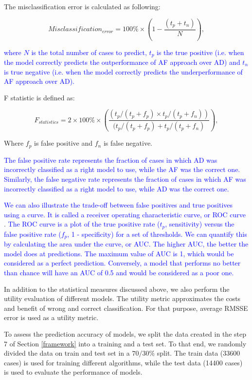 \documentclass[preprint, 3p,
authoryear]{elsarticle} %
\begin{document}
The misclassification error is calculated as following:

\[Misclassification_{error} = 100\% \times \left( 1-\frac{(t_p+t_n)}{N}\right),\]

\textcolor{blue}{where $N$ is the total number of cases to predict, $t_p$ is the true positive (i.e. when the model correctly predicts the outperformance of AF approach over AD) and $t_n$ is true negative (i.e. when the model correctly predicts the underperformance of AF approach over AD).}

F statistic is defined as:

\[F_{statistics} = 2 \times 100\% \times \left(\frac{(t_p/(t_p+f_p) \times t_p/(t_p+f_n))}{(t_p/(t_p+f_p)+t_p/(t_p+f_n)}\right),\]

Where \(f_p\) is false positive and \(f_n\) is false negative.

\textcolor{blue}{The false positive rate represents the fraction of cases in which AD was incorrectly classified as a right model to use, while the AF was the correct one. Similarly, the false negative rate represents the fraction of cases in which AF was incorrectly classified as a right model to use, while AD was the correct one.}

\textcolor{blue}{We can also illustrate the trade-off between false positives and true positives using a curve. It is called a receiver operating characteristic curve, or ROC curve}
\citep{james2021statistical}.
\textcolor{blue}{The ROC curve is a plot of the true positive rate ($t_p$, sensitivity) versus the false positive rate ($f_p$, 1 - specificity) for a set of thresholds. We can quantify this by calculating the area under the curve, or AUC. The higher AUC, the better the model does at predictions. The maximum value of AUC is 1, which would be considered as a perfect prediction. Conversely, a model that performs no better than chance will have an AUC of 0.5 and would be considered as a poor one.}

In addition to the statistical measures discussed above, we also perform
the utility evaluation of different models. The utility metric
approximates the costs and benefit of wrong and correct classification.
For that purpose, average RMSSE error is used as a utility metric.

To assess the prediction accuracy of models, we split the data created
in the step 7 of Section \ref{framework} into a training and a test set.
To that end, we randomly divided the data on train and test set in a
\(70/30 \%\) split. The train data (33600 cases) is used for training
different algorithms, while the test data (14400 cases) is used to
evaluate the performance of models.
\end{document}

